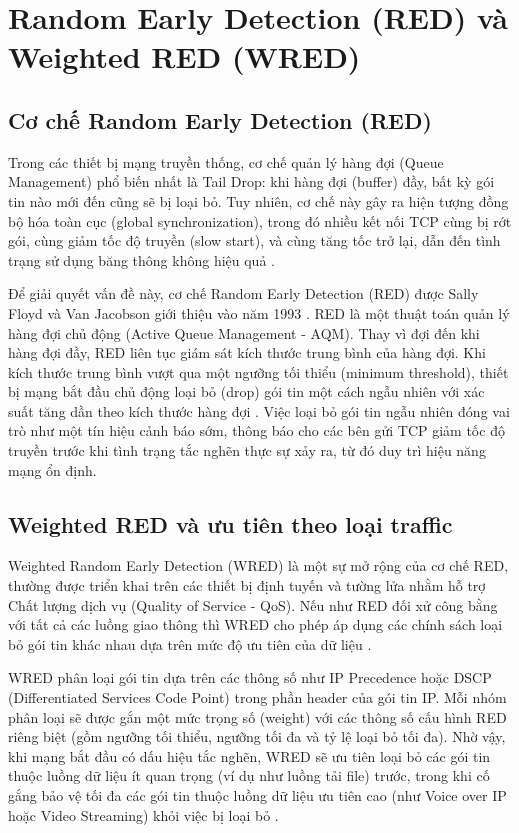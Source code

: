 \documentclass[../DoAn.tex]{subfiles}
\begin{document}
\section{Random Early Detection (RED) và Weighted RED (WRED)}
\subsection{Cơ chế Random Early Detection (RED)}
Trong các thiết bị mạng truyền thống, cơ chế quản lý hàng đợi (Queue Management) phổ biến nhất là Tail Drop: khi hàng đợi (buffer) đầy, bất kỳ gói tin nào mới đến cũng sẽ bị loại bỏ. Tuy nhiên, cơ chế này gây ra hiện tượng đồng bộ hóa toàn cục (global synchronization), trong đó nhiều kết nối TCP cùng bị rớt gói, cùng giảm tốc độ truyền (slow start), và cùng tăng tốc trở lại, dẫn đến tình trạng sử dụng băng thông không hiệu quả \cite{floyd1993random}.

Để giải quyết vấn đề này, cơ chế Random Early Detection (RED) được Sally Floyd và Van Jacobson giới thiệu vào năm 1993 \cite{floyd1993random}. RED là một thuật toán quản lý hàng đợi chủ động (Active Queue Management - AQM). Thay vì đợi đến khi hàng đợi đầy, RED liên tục giám sát kích thước trung bình của hàng đợi. Khi kích thước trung bình vượt qua một ngưỡng tối thiểu (minimum threshold), thiết bị mạng bắt đầu chủ động loại bỏ (drop) gói tin một cách ngẫu nhiên với xác suất tăng dần theo kích thước hàng đợi \cite{floyd1993random, rfc2309}. Việc loại bỏ gói tin ngẫu nhiên đóng vai trò như một tín hiệu cảnh báo sớm, thông báo cho các bên gửi TCP giảm tốc độ truyền trước khi tình trạng tắc nghẽn thực sự xảy ra, từ đó duy trì hiệu năng mạng ổn định.

\subsection{Weighted RED và ưu tiên theo loại traffic}
Weighted Random Early Detection (WRED) là một sự mở rộng của cơ chế RED, thường được triển khai trên các thiết bị định tuyến và tường lửa nhằm hỗ trợ Chất lượng dịch vụ (Quality of Service - QoS). Nếu như RED đối xử công bằng với tất cả các luồng giao thông thì WRED cho phép áp dụng các chính sách loại bỏ gói tin khác nhau dựa trên mức độ ưu tiên của dữ liệu \cite{rfc2309}.

WRED phân loại gói tin dựa trên các thông số như IP Precedence hoặc DSCP (Differentiated Services Code Point) trong phần header của gói tin IP. Mỗi nhóm phân loại sẽ được gắn một mức trọng số (weight) với các thông số cấu hình RED riêng biệt (gồm ngưỡng tối thiểu, ngưỡng tối đa và tỷ lệ loại bỏ tối đa). Nhờ vậy, khi mạng bắt đầu có dấu hiệu tắc nghẽn, WRED sẽ ưu tiên loại bỏ các gói tin thuộc luồng dữ liệu ít quan trọng (ví dụ như luồng tải file) trước, trong khi cố gắng bảo vệ tối đa các gói tin thuộc luồng dữ liệu ưu tiên cao (như Voice over IP hoặc Video Streaming) khỏi việc bị loại bỏ \cite{rfc2309}.
\end{document}
